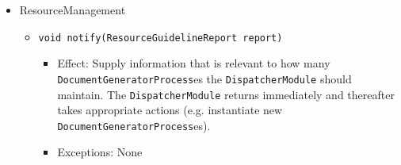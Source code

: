 \documentclass[a4paper,10pt]{article}
\begin{document}
\begin{itemize}
	\item ResourceManagement
	\begin{itemize}
		\item \texttt{void notify(ResourceGuidelineReport report)}
		\begin{itemize}
			\item Effect: Supply information that is relevant to how many \texttt{DocumentGeneratorProcess}es the \texttt{DispatcherModule} should maintain. The \texttt{DispatcherModule} returns immediately and thereafter takes appropriate actions (e.g. instantiate new \texttt{DocumentGeneratorProcess}es).
			\item Exceptions: None
		\end{itemize}
	\end{itemize}
\end{itemize}
\end{document}
